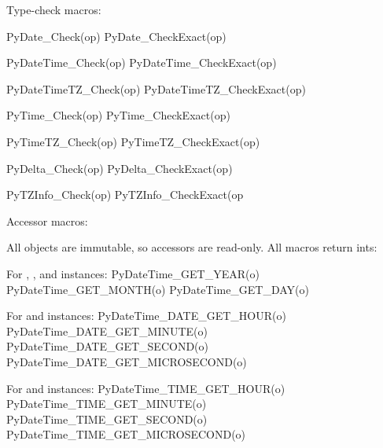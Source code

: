 Type-check macros:

    PyDate_Check(op)
    PyDate_CheckExact(op)

    PyDateTime_Check(op)
    PyDateTime_CheckExact(op)

    PyDateTimeTZ_Check(op)
    PyDateTimeTZ_CheckExact(op)

    PyTime_Check(op)
    PyTime_CheckExact(op)

    PyTimeTZ_Check(op)
    PyTimeTZ_CheckExact(op)

    PyDelta_Check(op)
    PyDelta_CheckExact(op)

    PyTZInfo_Check(op)
    PyTZInfo_CheckExact(op

Accessor macros:

All objects are immutable, so accessors are read-only.  All macros
return ints:

    For , , and  instances:
        PyDateTime_GET_YEAR(o)
        PyDateTime_GET_MONTH(o)
        PyDateTime_GET_DAY(o)

    For  and  instances:
        PyDateTime_DATE_GET_HOUR(o)
        PyDateTime_DATE_GET_MINUTE(o)
        PyDateTime_DATE_GET_SECOND(o)
        PyDateTime_DATE_GET_MICROSECOND(o)

    For  and  instances:
        PyDateTime_TIME_GET_HOUR(o)
        PyDateTime_TIME_GET_MINUTE(o)
        PyDateTime_TIME_GET_SECOND(o)
        PyDateTime_TIME_GET_MICROSECOND(o)
